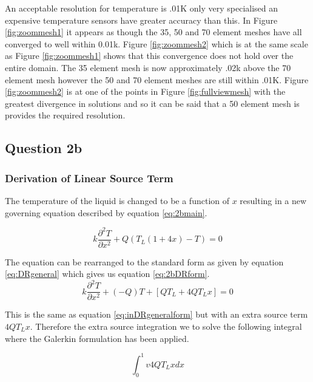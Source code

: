 \documentclass[11pt]{article}
\begin{document}
An acceptable resolution for temperature is .01K only very specialised an expensive temperature sensors have greater accuracy than this. In Figure \ref{fig:zoommesh1} it appears as though the 35, 50 and 70 element meshes have all converged to well within 0.01k. Figure \ref{fig:zoommesh2} which is at the same scale as Figure \ref{fig:zoommesh1} shows that this convergence does not hold over the entire domain. The 35 element mesh is now approximately .02k above the 70 element mesh however the 50 and 70 element meshes are still within .01K. Figure \ref{fig:zoommesh2} is at one of the points in Figure \ref{fig:fullviewmesh} with the greatest divergence in solutions and so it can be said that a 50 element mesh is provides the required resolution.

\clearpage

\subsection{Question 2b}

\subsubsection{Derivation of Linear Source Term}

The temperature of the liquid is changed to be a function of $x$  resulting in a new governing equation described by equation \ref{eq:2bmain}.

\begin{equation} \label{eq:2bmain}
k \frac{\partial^2 T}{\partial x^2} + Q(T_L(1 + 4x) - T) = 0
\end{equation}



The equation can be rearranged to the standard form as given by equation \ref{eq:DRgeneral} which gives us equation \ref{eq:2bDRform}.
\begin{equation} \label{eq:2bDFform}
k \frac{\partial^2 T}{\partial x^2} + (-Q)T + \left [ QT_L + 4QT_Lx \right ] = 0
\end{equation}

This is the same as equation \ref{eq:inDRgeneralform} but with an extra source term $4QT_Lx$. Therefore the extra source integration we to solve the following integral where the Galerkin formulation has been applied.

\begin{equation*}
\int_{0}^{1}v4QT_Lx dx
\end{equation*}
\end{document}

